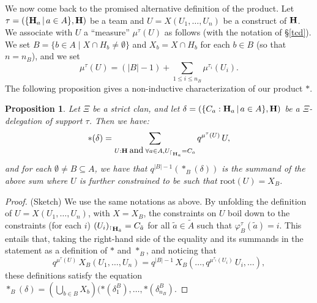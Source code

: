 \documentclass[11pt]{article}
\newtheorem{proposition}[theo]{Proposition}
\theoremstyle{definition}
\numberwithin{equation}{section}
\numberwithin{equation}{section}
\newcommand{\inc}{\subseteq}
\newcommand{\set}[1]{\{#1\}}
\newcommand{\setc}[2]{\set{#1 \mid #2}}
\newcommand{\Union}{\bigcup}		%
\newcommand{\hyper}[1]{{\bf #1}}
\newcommand{\restrconstr}[2]{{#1}_{{}^\lceil {#2}}}
\begin{document}
We now come back to the promised alternative definition of the   product. 
Let $\tau=(\{{\bf H}_a\,|\,a\in A\},{\bf H})$ be a team and $U=X(U_1,\ldots,U_n)$ be a construct of $\hyper{H}$. We  associate with $U$ a ``measure''  $\mu^\tau(U)$ as follows (with the notation of \S\ref{tcd}).  We set $B=\setc{b\in A}{X\cap H_b\neq\emptyset}$ and $X_b=X\cap H_b$ for each $b\in B$ (so that $n=n_B$), and we set
$$\mu^\tau(U)=(|B|-1)+ \sum_{1\leq i\leq n_B}\mu^{\tau_i}(U_i).$$The following proposition gives a non-inductive characterization of our product $\ast$.
\begin{proposition} \label{restriction-product-characterization} Let $\Xi$ be a strict clan, and
let $\delta=(\{C_a:{\bf H}_a\,|\, a\in A\},{\bf H})$ be a $\Xi$-delegation of support $\tau$. Then we have:
$$\ast(\delta)= \sum_{U:\hyper{H} \;\mbox{{\small and}}\; \forall a\in A, \restrconstr{U}{\hyper{H}_a}=C_a} q^{\mu^\tau(U)}\, U,$$
and for each $\emptyset\neq B\inc A$, we have that $q^{|B|-1} (\ast_B(\delta))$ is the summand of the above sum where $U$  is further constrained to be such that $\mbox{root}(U)=X_B$.
\end{proposition}
\begin{proof} (Sketch) We use the same notations as above. By unfolding the definition of $U=X(U_1,\ldots,U_n)$, with $X=X_B$, the constraints on $U$ boil down to the constraints (for each $i$) $\restrconstr{(U_i)}{\hyper{H}_{\tilde{a}}}=C_{\tilde{a}}$  for all $\tilde{a}\in\tilde{A}$ such that
$\varphi^{\tau}_B(\tilde{a})=i$. This entails that, taking the right-hand side of the equality and its summands   in the statement as a definition of $\ast$ and $\ast_B$, and noticing that
\begin{equation*}
q^{\mu^\tau(U)}\, X_B(U_1,\ldots,U_n)= q^{|B|-1}\, X_B(\ldots,q^{\mu^{\tau_i}(U_i)}\, U_i,\ldots),
\end{equation*}
 these definitions satisfy the equation $\ast_B(\delta)=(\Union_{b\in B}X_b)(\ast(\delta^B_1),\dots,\ast(\delta^B_{n_{B}})$.
\end{proof}
\end{document}
